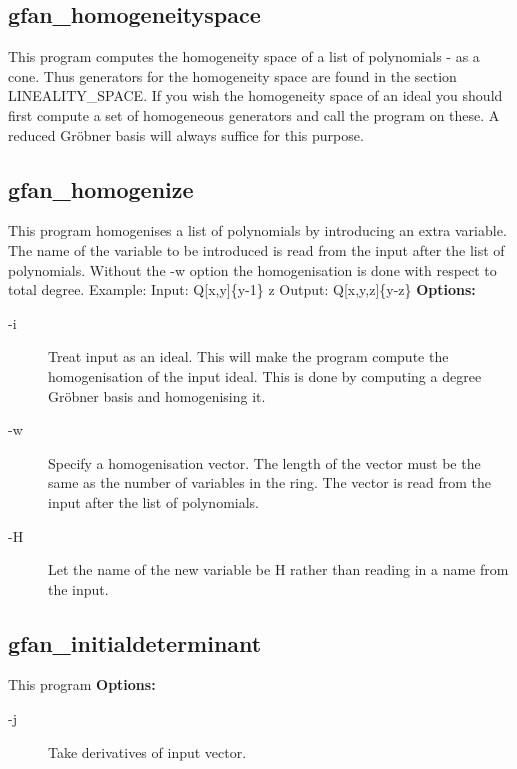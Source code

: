 {{{{{{{{{{{{{{{{{\subsection{gfan\_homogeneityspace}\label{applist:_homogeneityspace}
This program computes the homogeneity space of a list of polynomials - as a cone. Thus generators for the homogeneity space are found in the section LINEALITY\_SPACE. If you wish the homogeneity space of an ideal you should first compute a set of homogeneous generators and call the program on these. A reduced Gr\"obner basis will always suffice for this purpose.


{\subsection{gfan\_homogenize}\label{applist:_homogenize}
This program homogenises a list of polynomials by introducing an extra variable. The name of the variable to be introduced is read from the input after the list of polynomials. Without the -w option the homogenisation is done with respect to total degree.
Example:
Input:
Q[x,y]\{y-1\}
z
Output:
Q[x,y,z]\{y-z\}
\newline
{\bf Options:}
\begin{description}
\item[-i]Treat input as an ideal. This will make the program compute the homogenisation of the input ideal. This is done by computing a degree Gr\"obner basis and homogenising it.\item[-w]Specify a homogenisation vector. The length of the vector must be the same as the number of variables in the ring. The vector is read from the input after the list of polynomials.
\item[-H]Let the name of the new variable be H rather than reading in a name from the input.\end{description}


{\subsection{gfan\_initialdeterminant}\label{applist:_initialdeterminant}
This program 
\newline
{\bf Options:}
\begin{description}
\item[-j]Take derivatives of input vector.\end{description}


}}}}}}}}}}}}}}}}}}}
